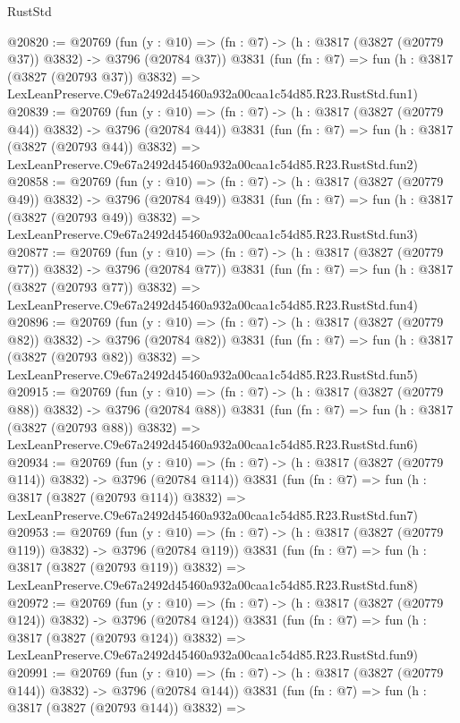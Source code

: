 \begin{lexlean}{RustStd}
\begin{coremodule}
@20820 := @20769
    (fun (y : @10) => (fn : @7) -> (h : @3817 (@3827 (@20779 @37)) @3832) -> @3796 (@20784 @37))
    @3831
    (fun (fn : @7) =>
    fun (h : @3817 (@3827 (@20793 @37)) @3832) =>
    LexLeanPreserve.C9e67a2492d45460a932a00caa1c54d85.R23.RustStd.fun1)
@20839 := @20769
    (fun (y : @10) => (fn : @7) -> (h : @3817 (@3827 (@20779 @44)) @3832) -> @3796 (@20784 @44))
    @3831
    (fun (fn : @7) =>
    fun (h : @3817 (@3827 (@20793 @44)) @3832) =>
    LexLeanPreserve.C9e67a2492d45460a932a00caa1c54d85.R23.RustStd.fun2)
@20858 := @20769
    (fun (y : @10) => (fn : @7) -> (h : @3817 (@3827 (@20779 @49)) @3832) -> @3796 (@20784 @49))
    @3831
    (fun (fn : @7) =>
    fun (h : @3817 (@3827 (@20793 @49)) @3832) =>
    LexLeanPreserve.C9e67a2492d45460a932a00caa1c54d85.R23.RustStd.fun3)
@20877 := @20769
    (fun (y : @10) => (fn : @7) -> (h : @3817 (@3827 (@20779 @77)) @3832) -> @3796 (@20784 @77))
    @3831
    (fun (fn : @7) =>
    fun (h : @3817 (@3827 (@20793 @77)) @3832) =>
    LexLeanPreserve.C9e67a2492d45460a932a00caa1c54d85.R23.RustStd.fun4)
@20896 := @20769
    (fun (y : @10) => (fn : @7) -> (h : @3817 (@3827 (@20779 @82)) @3832) -> @3796 (@20784 @82))
    @3831
    (fun (fn : @7) =>
    fun (h : @3817 (@3827 (@20793 @82)) @3832) =>
    LexLeanPreserve.C9e67a2492d45460a932a00caa1c54d85.R23.RustStd.fun5)
@20915 := @20769
    (fun (y : @10) => (fn : @7) -> (h : @3817 (@3827 (@20779 @88)) @3832) -> @3796 (@20784 @88))
    @3831
    (fun (fn : @7) =>
    fun (h : @3817 (@3827 (@20793 @88)) @3832) =>
    LexLeanPreserve.C9e67a2492d45460a932a00caa1c54d85.R23.RustStd.fun6)
@20934 := @20769
    (fun (y : @10) => (fn : @7) -> (h : @3817 (@3827 (@20779 @114)) @3832) -> @3796 (@20784 @114))
    @3831
    (fun (fn : @7) =>
    fun (h : @3817 (@3827 (@20793 @114)) @3832) =>
    LexLeanPreserve.C9e67a2492d45460a932a00caa1c54d85.R23.RustStd.fun7)
@20953 := @20769
    (fun (y : @10) => (fn : @7) -> (h : @3817 (@3827 (@20779 @119)) @3832) -> @3796 (@20784 @119))
    @3831
    (fun (fn : @7) =>
    fun (h : @3817 (@3827 (@20793 @119)) @3832) =>
    LexLeanPreserve.C9e67a2492d45460a932a00caa1c54d85.R23.RustStd.fun8)
@20972 := @20769
    (fun (y : @10) => (fn : @7) -> (h : @3817 (@3827 (@20779 @124)) @3832) -> @3796 (@20784 @124))
    @3831
    (fun (fn : @7) =>
    fun (h : @3817 (@3827 (@20793 @124)) @3832) =>
    LexLeanPreserve.C9e67a2492d45460a932a00caa1c54d85.R23.RustStd.fun9)
@20991 := @20769
    (fun (y : @10) => (fn : @7) -> (h : @3817 (@3827 (@20779 @144)) @3832) -> @3796 (@20784 @144))
    @3831
    (fun (fn : @7) =>
    fun (h : @3817 (@3827 (@20793 @144)) @3832) =>

\end{coremodule}
\end{lexlean}
